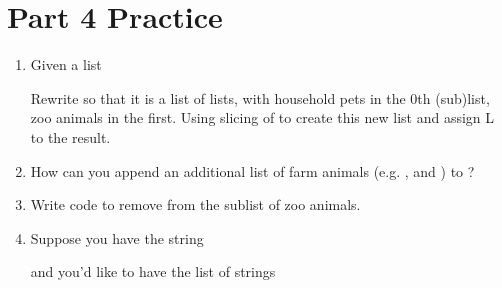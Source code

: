 \documentclass[letterpaper,10pt,english]{sphinxmanual}
\begin{document}
\section{Part 4 Practice}
\label{\detokenize{lecture_notes/lec10_lists2:part-4-practice}}\begin{enumerate}
\item {} 
Given a list

%
\begin{sphinxVerbatim}[commandchars=\\\{\}]
  \PYG{p}{[}     \PYG{p}{]}
\end{sphinxVerbatim}

Rewrite  so that it is a list of lists, with household pets in
the 0th (sub)list, zoo animals in the first.  Using slicing of
 to create this new list and assign L to the result.

\item {} 
How can you append an additional list of farm animals (e.g.
,  and ) to ?

\item {} 
Write code to remove  from the sublist of zoo animals.

\item {} 
Suppose you have the string

%
\begin{sphinxVerbatim}[commandchars=\\\{\}]
  
\end{sphinxVerbatim}

and you’d like to have the list of strings

%
\begin{sphinxVerbatim}[commandchars=\\\{\}]
  \PYG{p}{[}    \PYG{p}{]}
\end{sphinxVerbatim}


\end{enumerate}
\end{document}

